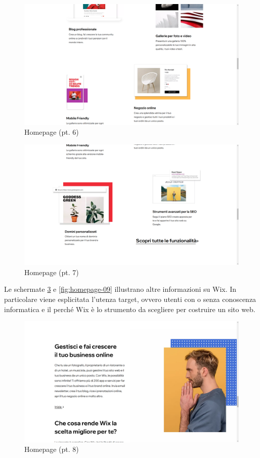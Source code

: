 \documentclass[11pt,a4paper]{article}
\newcommand*{\wix}{Wix}
\begin{document}
\begin{figure}[H]
  \centering
  \includegraphics[width=1\textwidth]{img/homepage-06.png}
  \caption{Homepage (pt. 6)}
  \label{fig:homepage-06}
\end{figure}

\begin{figure}[H]
  \centering
  \includegraphics[width=1\textwidth]{img/homepage-07.png}
  \caption{Homepage (pt. 7)}
  \label{fig:homepage-07}
\end{figure}

Le schermate \ref{fig:homepage-08} e \ref{fig:homepage-09} illustrano
altre informazioni su \wix{}. In particolare viene esplicitata
l'utenza target, ovvero utenti con o senza conoscenza informatica e il
perché \wix{} è lo strumento da scegliere per costruire un sito web.

\begin{figure}[H]
  \centering
  \includegraphics[width=1\textwidth]{img/homepage-08.png}
  \caption{Homepage (pt. 8)}
  \label{fig:homepage-08}
\end{figure}
\end{document}

